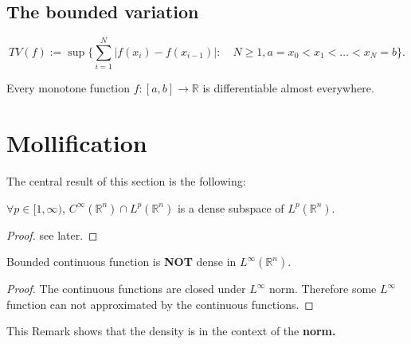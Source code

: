 \subsection{The bounded variation}	
\begin{definition}
\begin{equation}
	TV(f):= \sup \bigg\{ \sum_{i = 1}^N |f(x_i) - f(x_{i -1})| : \quad N \ge 1, a = x_0< x_1< \dots<x_N = b \bigg\}. 
\end{equation}
\end{definition}

\begin{theorem}
	Every monotone function $f:[a, b] \rightarrow \mathbb{R}$ is differentiable almost everywhere.
\end{theorem}



\newpage
\section{Mollification}
The central result of this section is the following:
\begin{theorem}
	$\forall p \in [1, \infty)$, $C^\infty(\mathbb{R}^n) \cap L^p(\mathbb{R}^n)$ is a dense subspace of $L^p(\mathbb{R}^n)$.
\end{theorem}
\begin{proof}
see later. 
\end{proof}

\begin{remark}
Bounded continuous function is \textbf{NOT} dense in $L^\infty(\mathbb{R}^n)$.	
\begin{proof}
	The continuous functions are closed under $L^\infty$ norm. Therefore some $L^\infty$ function can not approximated by the continuous functions.
\end{proof}
This Remark shows that the density is in the context of the \textbf{norm.} 
\end{remark}

